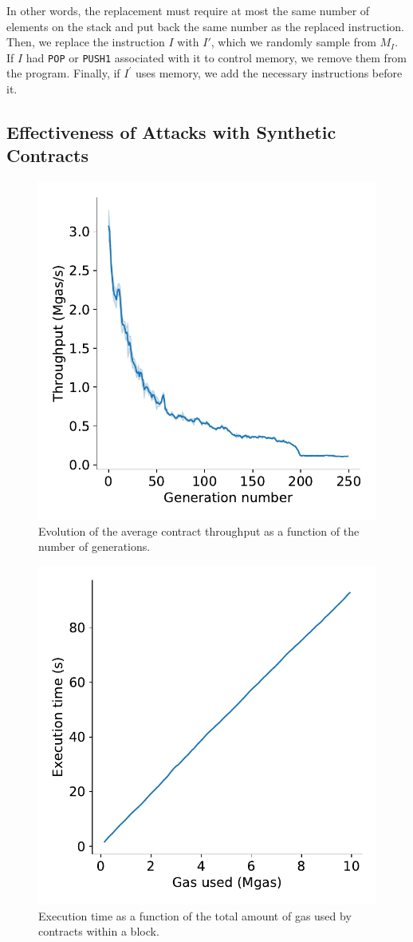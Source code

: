   In other words, the replacement must require at most the same number of elements on the stack and put back the same number as the replaced instruction. Then, we replace the instruction $I$ with $I'$, which we randomly sample from $M_I$. If $I$ had \lstinline{POP} or \lstinline{PUSH1} associated with it to control memory, we remove them from the program. Finally, if $I^\prime$ uses memory, we add the necessary instructions before it.

  \subsection{Effectiveness of Attacks with Synthetic Contracts}
  \begin{figure}[tb]
    \centering
    \includegraphics[width=.8\columnwidth]{./3-vm-security/figures/ga-contract-gas-results.pdf}
    \caption{Evolution of the average contract throughput as a function of the number of generations.}
    \label{fig:throughput-evolution}
  \end{figure}

  \begin{figure}[tb]
    \centering
    \includegraphics[width=.7\columnwidth]{./3-vm-security/figures/block-execution-time.pdf}
    \caption{Execution time as a function of the total amount of gas used by contracts within a block.}
    \label{fig:block-exec-speed}
  \end{figure}

